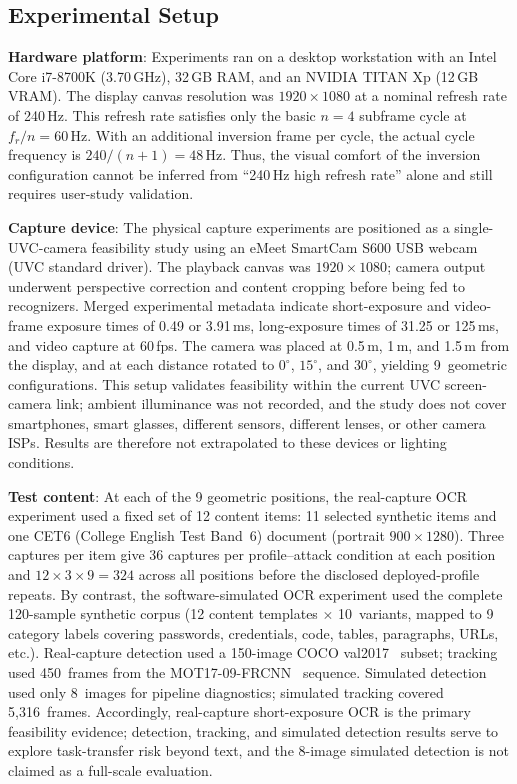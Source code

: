 \documentclass{ieeeaccess}
\begin{document}
\subsection{Experimental Setup}
\label{sec:setup}

\textbf{Hardware platform}: Experiments ran on a desktop workstation with an Intel Core i7-8700K (3.70\,GHz), 32\,GB RAM, and an NVIDIA TITAN Xp (12\,GB VRAM). The display canvas resolution was $1920 \times 1080$ at a nominal refresh rate of 240\,Hz. This refresh rate satisfies only the basic $n=4$ subframe cycle at $f_r/n=60$\,Hz. With an additional inversion frame per cycle, the actual cycle frequency is $240/(n+1)=48$\,Hz. Thus, the visual comfort of the inversion configuration cannot be inferred from ``240\,Hz high refresh rate'' alone and still requires user-study validation.

\textbf{Capture device}: The physical capture experiments are positioned as a single-UVC-camera feasibility study using an eMeet SmartCam S600 USB webcam (UVC standard driver). The playback canvas was $1920 \times 1080$; camera output underwent perspective correction and content cropping before being fed to recognizers. Merged experimental metadata indicate short-exposure and video-frame exposure times of 0.49 or 3.91\,ms, long-exposure times of 31.25 or 125\,ms, and video capture at 60\,fps. The camera was placed at 0.5\,m, 1\,m, and 1.5\,m from the display, and at each distance rotated to $0^{\circ}$, $15^{\circ}$, and $30^{\circ}$, yielding 9~geometric configurations. This setup validates feasibility within the current UVC screen-camera link; ambient illuminance was not recorded, and the study does not cover smartphones, smart glasses, different sensors, different lenses, or other camera ISPs. Results are therefore not extrapolated to these devices or lighting conditions.

\textbf{Test content}: At each of the 9 geometric positions, the real-capture OCR experiment used a fixed set of 12 content items: 11 selected synthetic items and one CET6 (College English Test Band~6) document (portrait $900 \times 1280$). Three captures per item give 36 captures per profile--attack condition at each position and $12\times3\times9=324$ across all positions before the disclosed deployed-profile repeats. By contrast, the software-simulated OCR experiment used the complete 120-sample synthetic corpus (12 content templates $\times$ 10~variants, mapped to 9 category labels covering passwords, credentials, code, tables, paragraphs, URLs, etc.). Real-capture detection used a 150-image COCO val2017~\cite{b_coco2014} subset; tracking used 450~frames from the MOT17-09-FRCNN~\cite{b_mot16} sequence. Simulated detection used only 8~images for pipeline diagnostics; simulated tracking covered 5,316~frames. Accordingly, real-capture short-exposure OCR is the primary feasibility evidence; detection, tracking, and simulated detection results serve to explore task-transfer risk beyond text, and the 8-image simulated detection is not claimed as a full-scale evaluation.
\end{document}
